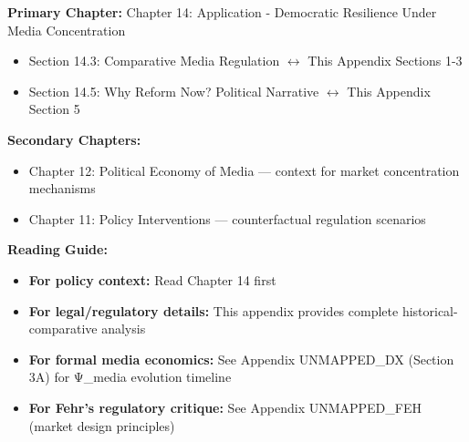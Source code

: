 \begin{tcolorbox}[colback=purple!5!white, colframe=purple!75!black,
    title=Chapter Linkage]

\textbf{Primary Chapter:} Chapter 14: Application - Democratic Resilience Under Media Concentration

\begin{itemize}[nosep]
\item Section 14.3: Comparative Media Regulation $\leftrightarrow$ This Appendix Sections 1-3
\item Section 14.5: Why Reform Now? Political Narrative $\leftrightarrow$ This Appendix Section 5
\end{itemize}

\textbf{Secondary Chapters:}
\begin{itemize}[nosep]
\item Chapter 12: Political Economy of Media --- context for market concentration mechanisms
\item Chapter 11: Policy Interventions --- counterfactual regulation scenarios
\end{itemize}

\textbf{Reading Guide:}
\begin{itemize}[nosep]
\item \textbf{For policy context:} Read Chapter 14 first
\item \textbf{For legal/regulatory details:} This appendix provides complete historical-comparative analysis
\item \textbf{For formal media economics:} See Appendix UNMAPPED_DX (Section 3A) for Ψ_media evolution timeline
\item \textbf{For Fehr's regulatory critique:} See Appendix UNMAPPED_FEH (market design principles)
\end{itemize}

\end{tcolorbox}



